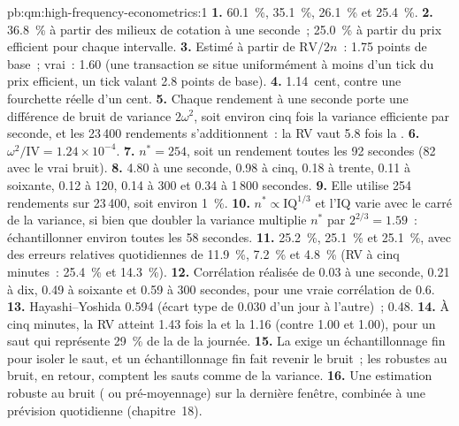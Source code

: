 \begin{solution}{pb:qm:high-frequency-econometrics:1}
\textbf{1.} 60.1~\%, 35.1~\%, 26.1~\% et 25.4~\%.
\textbf{2.} 36.8~\% à partir des milieux de cotation à une seconde~; 25.0~\% à partir du prix efficient pour chaque intervalle.
\textbf{3.} Estimé à partir de $\mathrm{RV}/2n$~: 1.75 points de base~; vrai~: 1.60 (une transaction se situe uniformément à moins d'un tick du prix efficient, un tick valant 2.8 points de base).
\textbf{4.} 1.14~cent, contre une fourchette réelle d'un cent.
\textbf{5.} Chaque rendement à une seconde porte une différence de bruit de variance $2\omega^2$, soit environ cinq fois la variance efficiente par seconde, et les 23\,400 rendements s'additionnent~: la RV vaut 5.8 fois
la .
\textbf{6.} $\omega^2/\mathrm{IV} = 1.24 \times 10^{-4}$.
\textbf{7.} $n^* = 254$, soit un rendement toutes les 92 secondes (82 avec le vrai bruit).
\textbf{8.} 4.80 à une seconde, 0.98 à cinq, 0.18 à trente, 0.11 à soixante, 0.12 à 120, 0.14 à 300 et 0.34 à 1\,800 secondes.
\textbf{9.} Elle utilise 254 rendements sur 23\,400, soit environ 1~\%.
\textbf{10.} $n^* \propto \mathrm{IQ}^{1/3}$ et l'IQ varie avec le carré de la variance, si bien que doubler la variance multiplie $n^*$ par $2^{2/3} = 1.59$~: échantillonner environ toutes les 58 secondes.
\textbf{11.} 25.2~\%, 25.1~\% et 25.1~\%, avec des erreurs relatives quotidiennes de 11.9~\%, 7.2~\% et 4.8~\% (RV à cinq minutes~: 25.4~\% et 14.3~\%).
\textbf{12.} Corrélation réalisée de 0.03 à une seconde, 0.21 à dix, 0.49 à soixante et 0.59 à 300 secondes, pour une vraie corrélation de 0.6.
\textbf{13.} Hayashi--Yoshida 0.594 (écart type de 0.030 d'un jour à l'autre)~;  0.48.
\textbf{14.} À cinq minutes, la RV atteint 1.43 fois la  et la  1.16 (contre 1.00 et 1.00), pour un saut qui représente 29~\% de la 
de la journée.
\textbf{15.} La  exige un échantillonnage fin pour isoler le saut, et un échantillonnage fin fait revenir le bruit~; les  robustes au bruit, en retour, comptent les sauts comme de la variance.
\textbf{16.} Une estimation robuste au bruit ( ou pré-moyennage) sur la dernière fenêtre, combinée à une prévision quotidienne (chapitre~18).

\end{solution}
